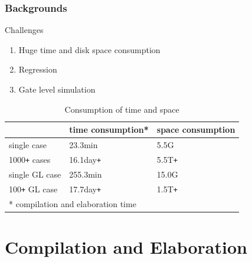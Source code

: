 \documentclass{beamer}
\begin{document}

\begin{frame}
  \frametitle{Backgrounds}
  \begin{block}{Challenges}
    \begin{enumerate}
    \item Huge time and disk space consumption
    \item Regression
    \item Gate level simulation
    \end{enumerate}
  \end{block}

  \begin{table}
    \centering
    \begin{tabular}{lll}
      \toprule
      & \textbf{time consumption}* & \textbf{space consumption} \\
      \midrule
      single case & 23.3min & 5.5G \\
      1000\texttt{+} cases & 16.1day\texttt{+} & 5.5T\texttt{+} \\
      single GL case & 255.3min & 15.0G \\
      100\texttt{+} GL case & 17.7day\texttt{+} & 1.5T\texttt{+} \\
      \bottomrule
      \multicolumn{3}{l}{\footnotesize{* compilation and elaboration time}}
    \end{tabular}
    \caption{Consumption of time and space}
  \end{table}
\end{frame}

\section{Compilation and Elaboration}
\end{document}
